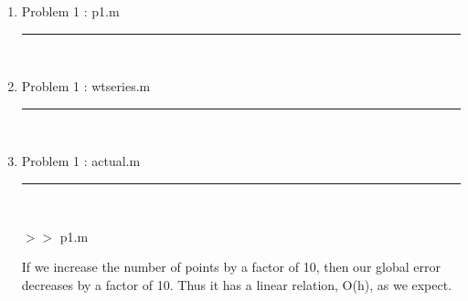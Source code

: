 \documentclass[12pt]{article}
\begin{document}
	\begin{enumerate}
	
	\item[] Problem 1 : p1.m \noindent\rule{\textwidth}{1.0pt} \\
		
	
	\pagebreak
	
	\item[] Problem 1 : wtseries.m \noindent\rule{\textwidth}{1.0pt} \\
		
	
	\pagebreak	
	
	\item[] Problem 1 : actual.m \noindent\rule{\textwidth}{1.0pt} \\
		
	
	\pagebreak		
	
	$>>$ p1.m
	\begin{framed}

If we increase the number of points by a factor of 10, then our global error decreases by a factor of 10. Thus it has a linear relation, O(h), as we expect.

	\end{framed}
	

\end{enumerate}
\end{document}
